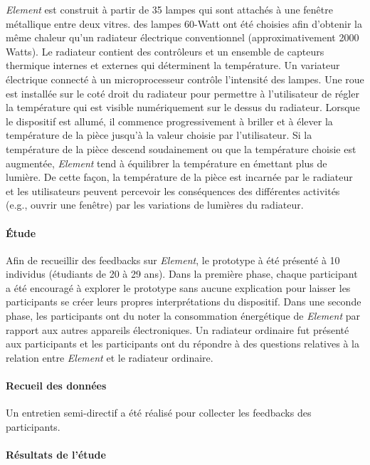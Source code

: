 \documentclass[10pt,a5paper,twoside]{article}
\begin{document}
\emph{Element} est construit à partir de 35 lampes qui sont attachés à
une fenêtre métallique entre deux vitres. des lampes 60-Watt ont été
choisies afin d'obtenir la même chaleur qu'un radiateur électrique
conventionnel (approximativement 2000 Watts). Le radiateur contient des
contrôleurs et un ensemble de capteurs thermique internes et externes
qui déterminent la température. Un variateur électrique connecté à un
microprocesseur contrôle l'intensité des lampes. Une roue est installée
sur le coté droit du radiateur pour permettre à l'utilisateur de régler
la température qui est visible numériquement sur le dessus du radiateur.
Lorsque le dispositif est allumé, il commence progressivement à briller
et à élever la température de la pièce jusqu'à la valeur choisie par
l'utilisateur. Si la température de la pièce descend soudainement ou que
la température choisie est augmentée, \emph{Element} tend à équilibrer
la température en émettant plus de lumière. De cette façon, la
température de la pièce est incarnée par le radiateur et les
utilisateurs peuvent percevoir les conséquences des différentes
activités (e.g., ouvrir une fenêtre) par les variations de lumières du
radiateur.

\paragraph{Étude}\label{uxe9tude-6}

Afin de recueillir des feedbacks sur \emph{Element}, le prototype à été
présenté à 10 individus (étudiants de 20 à 29 ans). Dans la première
phase, chaque participant a été encouragé à explorer le prototype sans
aucune explication pour laisser les participants se créer leurs propres
interprétations du dispositif. Dans une seconde phase, les participants
ont du noter la consommation énergétique de \emph{Element} par rapport
aux autres appareils électroniques. Un radiateur ordinaire fut présenté
aux participants et les participants ont du répondre à des questions
relatives à la relation entre \emph{Element} et le radiateur ordinaire.

\paragraph{Recueil des données}\label{recueil-des-donnuxe9es-7}

Un entretien semi-directif a été réalisé pour collecter les feedbacks
des participants.

\paragraph{Résultats de l'étude}\label{ruxe9sultats-de-luxe9tude}
\end{document}
